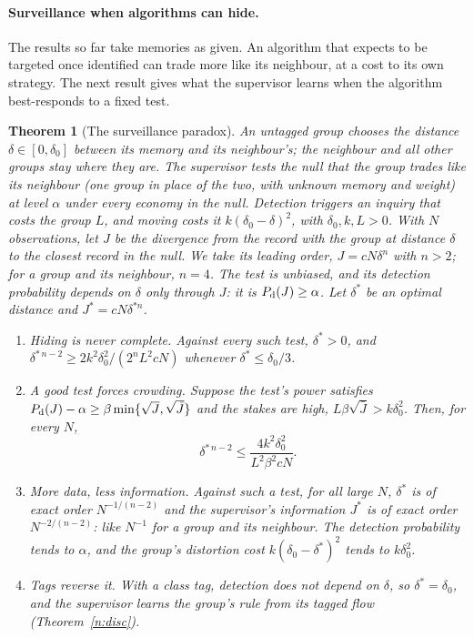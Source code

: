 \documentclass[12pt]{article}
\newtheorem{theorem}{Theorem}[section]
\theoremstyle{definition}
\theoremstyle{remark}
\begin{document}
\paragraph{Surveillance when algorithms can hide.} The results so far take memories as given. An algorithm that expects to be targeted once identified can trade more like its neighbour, at a cost to its own strategy. The next result gives what the supervisor learns when the algorithm best-responds to a fixed test.

\begin{theorem}[The surveillance paradox]\label{n:paradox}
An untagged group chooses the distance $\delta\in[0,\delta_0]$ between its memory and its neighbour's; the neighbour and all other groups stay where they are. The supervisor tests the null that the group trades like its neighbour (one group in place of the two, with unknown memory and weight) at level $\alpha$ under every economy in the null. Detection triggers an inquiry that costs the group $L$, and moving costs it $k(\delta_0-\delta)^2$, with $\delta_0,k,L>0$. With $N$ observations, let $J$ be the divergence from the record with the group at distance $\delta$ to the closest record in the null. We take its leading order, $J=cN\delta^n$ with $n>2$; for a group and its neighbour, $n=4$. The test is unbiased, and its detection probability depends on $\delta$ only through $J$: it is $P_{\rm d}(J)\ge\alpha$. Let $\delta^*$ be an optimal distance and $J^*=cN\delta^{*n}$.
\begin{enumerate}[label=(\roman*),itemsep=1pt]
\item \emph{Hiding is never complete.} Against every such test, $\delta^*>0$, and $\delta^{*\,n-2}\ge2k^2\delta_0^2/(2^nL^2cN)$ whenever $\delta^*\le\delta_0/3$.
\item \emph{A good test forces crowding.} Suppose the test's power satisfies $P_{\rm d}(J)-\alpha\ge\beta\min\{\sqrt J,\sqrt{\bar J}\}$ and the stakes are high, $L\beta\sqrt{\bar J}>k\delta_0^2$. Then, for every $N$,
\[
\delta^{*\,n-2}\le\frac{4k^2\delta_0^2}{L^2\beta^2cN}.
\]
\item \emph{More data, less information.} Against such a test, for all large $N$, $\delta^*$ is of exact order $N^{-1/(n-2)}$ and the supervisor's information $J^*$ is of exact order $N^{-2/(n-2)}$: like $N^{-1}$ for a group and its neighbour. The detection probability tends to $\alpha$, and the group's distortion cost $k(\delta_0-\delta^*)^2$ tends to $k\delta_0^2$.
\item \emph{Tags reverse it.} With a class tag, detection does not depend on $\delta$, so $\delta^*=\delta_0$, and the supervisor learns the group's rule from its tagged flow (Theorem~\ref{n:disc}).
\end{enumerate}
\end{theorem}
\end{document}
